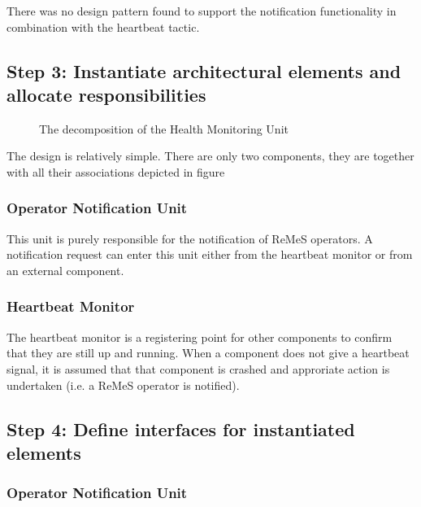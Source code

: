 \npar There was no design pattern found to support the notification
functionality in combination with the heartbeat tactic.

\subsection{Step 3: Instantiate architectural elements and allocate responsibilities}
\label{add:it8/elements}

\begin{figure}[H]
	\begin{centering}
		\caption{The decomposition of the Health Monitoring Unit}
		\label{fig:add/it8/decomposition}
	\end{centering}
\end{figure}

\npar The design is relatively simple. There are only two components, they are
together with all their associations depicted in figure
\subsubsection{Operator Notification Unit}

\npar This unit is purely responsible for the notification of ReMeS operators. A
notification request can enter this unit either from the heartbeat monitor or
from an external component.

\subsubsection{Heartbeat Monitor}

\npar The heartbeat monitor is a registering point for other components to
confirm that they are still up and running. When a component does not give a
heartbeat signal, it is assumed that that component is crashed and approriate
action is undertaken (i.e. a ReMeS operator is notified).

\subsection{Step 4: Define interfaces for instantiated elements}
\label{add:it8/interfaces}

\subsubsection{Operator Notification Unit}


